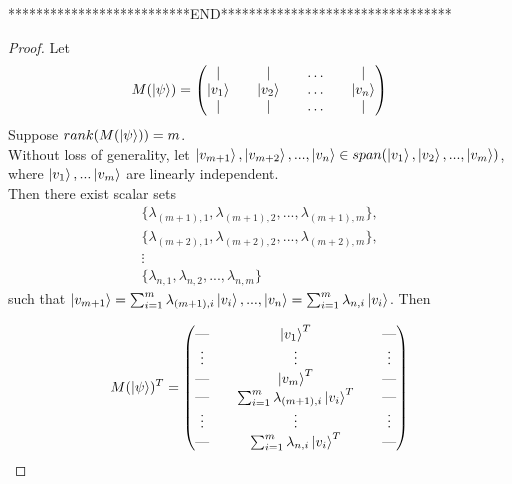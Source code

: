 **************************END*********************************
\begin{proof}
Let $$M(\ket{\psi})=
\begin{pmatrix}
\vert && \vert && \hdots && \vert\\
\ket{v_1} && \ket{v_2} && \hdots && \ket{v_n}\\
\vert && \vert && \hdots && \vert\\
\end{pmatrix}$$
Suppose $rank(M(\ket{\psi}))=m$.\\
Without loss of generality, let $\ket{v_{m+1}}, \ket{v_{m+2}},...,\ket{v_n} \in span(\ket{v_1},\ket{v_2},...,\ket{v_m})$, where $\ket{v_1}, ...\ket{v_m} $ are linearly independent.\\
Then there exist scalar sets 
\begin{gather}
\{\lambda_{(m+1),1}, \lambda_{(m+1),2},..., \lambda_{(m+1),m}\},\\
\{\lambda_{(m+2),1}, \lambda_{(m+2),2},..., \lambda_{(m+2),m}\},\\
\vdots\\
\{\lambda_{n,1}, \lambda_{n,2},..., \lambda_{n,m}\}    \end{gather}
 such that $\ket{v_{m+1}}=\sum_{i=1}^m \lambda_{(m+1), i}\ket{v_i},...,\ket{v_n}=\sum_{i=1}^m \lambda_{n, i}\ket{v_i}$. Then

\begin{equation}
M(\ket{\psi})^T=\begin{pmatrix}
\text{---} && \ket{v_1}^T &&\text{---} \\
\vdots && \vdots && \vdots\\
\text{---} && \ket{v_m}^T && \text{---} \\
\text{---} && \sum_{i=1}^m \lambda_{(m+1), i}\ket{v_i}^T  &&\text{---} \\
\vdots && \vdots && \vdots \\
\text{---} && \sum_{i=1}^m \lambda_{n, i}\ket{v_i}^T &&\text{---} \\
\end{pmatrix}    
\end{equation}


\end{proof}
